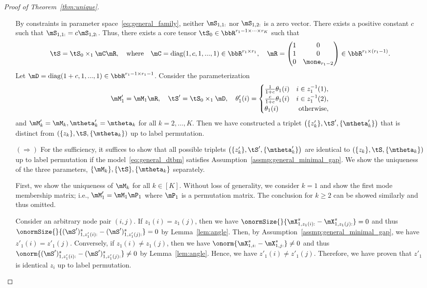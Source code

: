 \documentclass[lettersize,onecolumn,journal]{IEEEtran}
\theoremstyle{definition}
\theoremstyle{definition}
\newcommand{\of}[1]{\left(#1\right)}
\begin{document}
\begin{proof}[Proof of Theorem~\ref{thm:unique}]
\begin{enumerate}[wide]
{By constraints in parameter space~\eqref{eq:general_family}, neither $\mS_{1,1:}$ nor $\mS_{1,2:}$ is a zero vector.
}
There exists a positive constant $c$ such that $\mS_{1,1:} = c \mS_{1,2:}$. Thus, there exists a core tensor $\tS_0 \in \bbR^{r_1 -1 \times \cdots \times r_K}$ such that 
\begin{equation}
    \tS = \tS_0 \times_1 \mC \mR, \quad \text{where} \quad \mC = \text{diag}(1, c, 1,...,1) \in \bbR^{r_1 \times r_1}, \quad \mR = \begin{pmatrix}
    1& 0\\
    1&0 \\
    0 & \mone_{r_1-2}
    \end{pmatrix} \in \bbR^{r_1 \times (r_1 -1)}.
\end{equation}
Let $\mD = \text{diag}(1+c, 1,...,1) \in \bbR^{r_1 -1 \times r_1 -1}$. Consider the parameterization
\begin{equation}
    \mM'_1 = \mM_1 \mR, \quad \tS' = \tS_0 \times_1 \mD, \quad \theta'_{1}(i) = \begin{cases}
    \frac{1}{1+c} \theta_{1}(i) & i \in z_{1}^{-1}(1),\\
     \frac{c}{1+c} \theta_{1}(i) & i \in z_{1}^{-1}(2),\\
     \theta_{1}(i) & \text{ otherwise},
    \end{cases}
\end{equation}
and $\mM'_k = \mM_k, \mtheta'_k = \mtheta_k$ for all $k = 2, \ldots, K$. Then we have constructed a
triplet $\of{ \{z'_k\}, \tS', \{ \mtheta'_k \} }$ that is distinct from $\of{ \{z_k\}, \tS, \{ \mtheta_k \} }$ up to label permutation. 

\item[$(\Rightarrow)$] For the sufficiency, it suffices to show that all possible triplets $\of{ \{z'_k\}, \tS', \{ \mtheta'_k \} }$ are identical to $\of{ \{z_k\}, \tS, \{ \mtheta_k \} }$ up to label permutation if the model~\eqref{eq:general_dtbm} satisfies Assumption~\eqref{assmp:general_minimal_gap}. We show the uniqueness of the three parameters, $\{\mM_k\}, \{\tS\}, \{\mtheta_k\}$ separately.

First, we show the uniqueness of $\mM_k$ for all $k \in [K]$. Without loss of generality, we consider $k=1$ and show the first mode membership matrix; i.e., $\mM'_1 = \mM_1\mP_1$ where $\mP_1$ is a permutation matrix. The conclusion for $k\geq 2$ can be showed similarly and thus omitted. 

Consider an arbitrary node pair $(i,j)$. If $z_1(i) = z_1(j)$, then we have $\onormSize{}{\mX_{1, z_1(i):}^s - \mX_{1, z_1(j):}^s } = 0$ and thus $\onormSize{}{ (\mS')_{1, z'_1(i):}^{s} - (\mS')_{1, z'_1(j):}^{s} } = 0$ by Lemma~\ref{lem:angle}. Then, by Assumption~\eqref{assmp:general_minimal_gap}, we have $z'_1(i) = z'_1(j)$. Conversely, if $z_1(i) \neq z_1(j)$, then we have $ \onorm{\mX_{1,i:}^s - \mX_{1,j:}^s} \neq 0$ and thus $\onorm{ (\mS')_{1, z'_1(i):}^{s} - (\mS')_{1, z'_1(j):}^{s} } \neq 0$ by Lemma~\ref{lem:angle}. Hence, we have $z'_1(i) \neq z'_1(j)$. Therefore, we have proven that $z'_1$ is identical $z_i$ up to label permutation.


\end{enumerate}
\end{proof}
\end{document}
